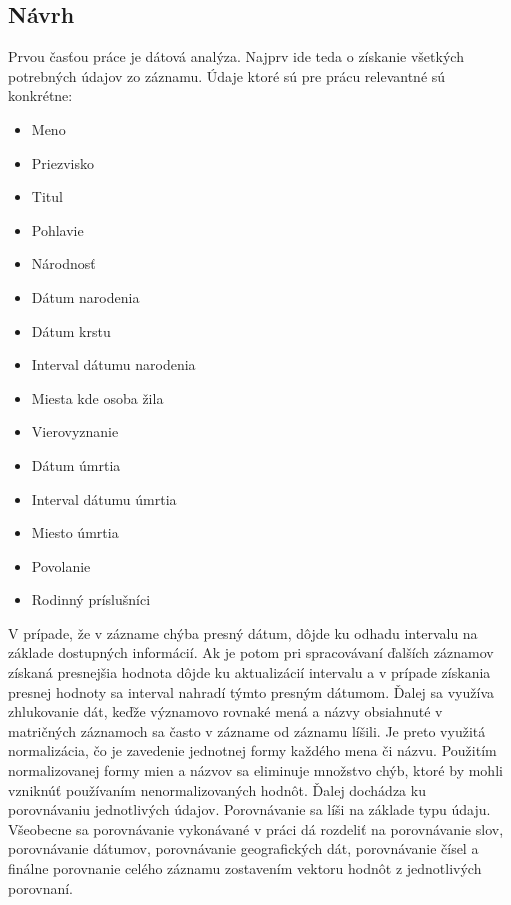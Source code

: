 \subsection{Návrh}
Prvou časťou práce je dátová analýza. Najprv ide teda o získanie všetkých potrebných 
údajov zo záznamu. Údaje ktoré sú pre prácu relevantné sú konkrétne:
\begin{multicols}{2}
    \begin{itemize}
        \item Meno
        \item Priezvisko
        \item Titul
        \item Pohlavie
        \item Národnosť
        \item Dátum narodenia
        \item Dátum krstu
        \item Interval dátumu narodenia
        \item Miesta kde osoba žila
        \item Vierovyznanie
        \item Dátum úmrtia
        \item Interval dátumu úmrtia
        \item Miesto úmrtia
        \item Povolanie
        \item Rodinný príslušníci
    \end{itemize}
\end{multicols}

V prípade, že v zázname chýba presný dátum, dôjde ku odhadu intervalu na základe dostupných informácií. Ak je potom pri spracovávaní ďalších záznamov získaná presnejšia hodnota dôjde ku aktualizácií intervalu a v prípade získania presnej hodnoty sa interval nahradí týmto presným dátumom. Ďalej sa využíva zhlukovanie dát, keďže významovo rovnaké mená a názvy obsiahnuté v matričných záznamoch sa často v zázname od záznamu líšili. Je preto využitá normalizácia, čo je zavedenie jednotnej formy každého mena či názvu. Použitím normalizovanej formy mien a názvov sa eliminuje množstvo chýb, ktoré 
by mohli vzniknúť používaním nenormalizovaných hodnôt.
Ďalej dochádza ku porovnávaniu jednotlivých údajov. Porovnávanie sa líši na základe typu 
údaju. Všeobecne sa porovnávanie vykonávané v práci dá rozdeliť na porovnávanie slov, 
porovnávanie dátumov, porovnávanie geografických dát, porovnávanie čísel a finálne 
porovnanie celého záznamu zostavením vektoru hodnôt z jednotlivých porovnaní. 

